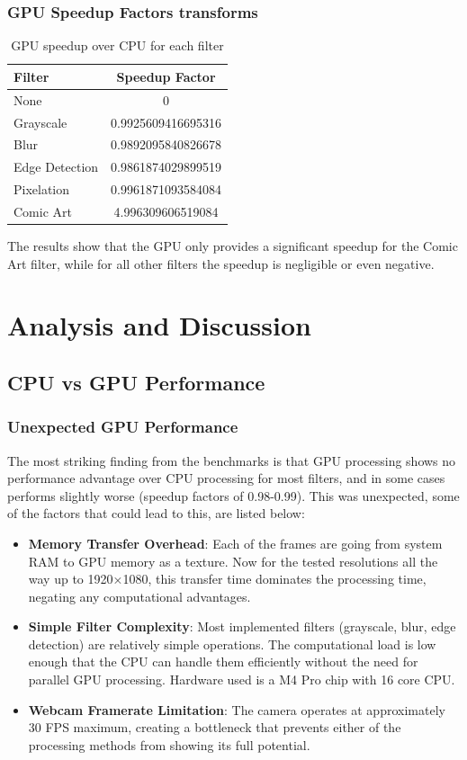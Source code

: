 \documentclass[12pt,a4paper]{article}
\begin{document}
\subsubsection{GPU Speedup Factors transforms}
\begin{table}[H]
    \centering
    \caption{GPU speedup over CPU for each filter}
    \label{tab:speedup}
    \begin{tabular}{lc}
        \toprule
        Filter & Speedup Factor \\
        \midrule
        None & 0 \\
        Grayscale & 0.9925609416695316 \\
        Blur & 0.9892095840826678 \\
        Edge Detection & 0.9861874029899519 \\
        Pixelation & 0.9961871093584084 \\
        Comic Art & 4.996309606519084 \\
        \bottomrule
    \end{tabular}
\end{table}
The results show that the GPU only provides a significant speedup for the Comic Art filter, while for all other filters the speedup is negligible or even negative.

\section{Analysis and Discussion}

\subsection{CPU vs GPU Performance}
\subsubsection{Unexpected GPU Performance}
The most striking finding from the benchmarks is that GPU processing shows no performance advantage over CPU processing for most filters, and in some cases performs slightly worse (speedup factors of 0.98-0.99). This was unexpected, some of the factors that could lead to this, are listed below:
\begin{itemize}
    \item \textbf{Memory Transfer Overhead}: Each of the frames are going from system RAM to GPU memory as a texture. Now for the tested resolutions all the way up to 1920×1080, this transfer time dominates the processing time, negating any computational advantages.
    \item \textbf{Simple Filter Complexity}: Most implemented filters (grayscale, blur, edge detection) are relatively simple operations. The computational load is low enough that the CPU can handle them efficiently without the need for parallel GPU processing. Hardware used is a M4 Pro chip with 16 core CPU.
    \item \textbf{Webcam Framerate Limitation}: The camera operates at approximately 30 FPS maximum, creating a bottleneck that prevents either of the processing methods from showing its full potential.
\end{itemize}
\end{document}
